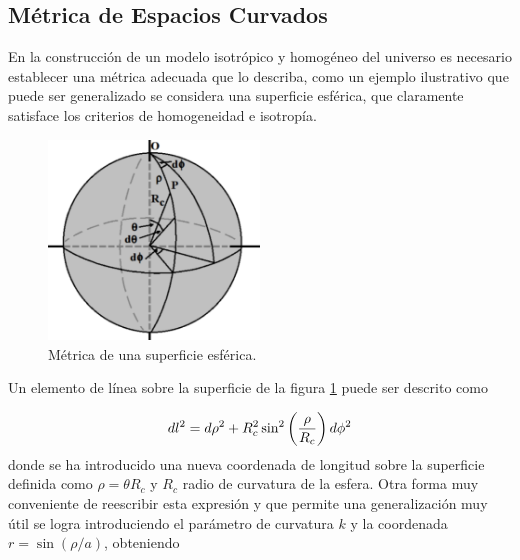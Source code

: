 	\subsection{Métrica de Espacios Curvados}
	\label{subsec:MetricOFCurvedSpaces}
	

En la construcción de un modelo isotrópico y homogéneo del universo es
necesario establecer una métrica adecuada que lo describa, como un ejemplo
ilustrativo que puede ser generalizado se considera una superficie 
esférica, que claramente satisface los criterios de homogeneidad e 
isotropía.


\begin{figure}[htbp]
	\centering
	\includegraphics[width=0.5\textwidth]
	{./figures/2_theoretical_framework/2D_Sphere.png}
	
	\caption{\small{Métrica de una superficie esférica.}}
	
	\label{fig:2sphere}
\end{figure}



Un elemento de línea sobre la superficie de la figura \ref{fig:2sphere} 
puede ser descrito como


\[ dl^2 = d\rho^2 + R_c^2 \sin^2 \left(  \frac{\rho}{R_c} \right)d\phi^2 \]
donde se ha introducido una nueva coordenada de longitud sobre la superficie
definida como $\rho = \theta R_c$ y $R_c$ radio de curvatura de la esfera. 
Otra forma muy conveniente de reescribir esta expresión y que permite una
generalización muy útil se logra introduciendo el parámetro de curvatura $k$ 
y la coordenada $r = \sin (\rho/a)$, obteniendo


